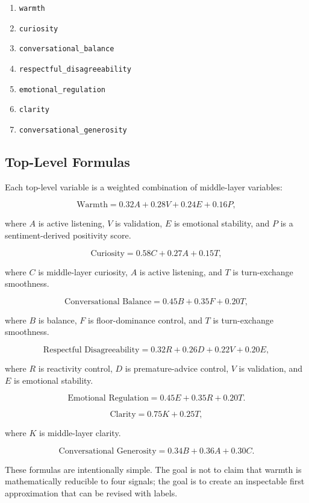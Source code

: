 \documentclass[11pt]{article}
\begin{document}
\begin{enumerate}[leftmargin=*]
  \item \texttt{warmth}
  \item \texttt{curiosity}
  \item \texttt{conversational\_balance}
  \item \texttt{respectful\_disagreeability}
  \item \texttt{emotional\_regulation}
  \item \texttt{clarity}
  \item \texttt{conversational\_generosity}
\end{enumerate}

\subsection{Top-Level Formulas}

Each top-level variable is a weighted combination of middle-layer variables:

\[
\text{Warmth} =
0.32A + 0.28V + 0.24E + 0.16P,
\]

where \(A\) is active listening, \(V\) is validation, \(E\) is emotional stability, and \(P\) is a sentiment-derived positivity score.

\[
\text{Curiosity} =
0.58C + 0.27A + 0.15T,
\]

where \(C\) is middle-layer curiosity, \(A\) is active listening, and \(T\) is turn-exchange smoothness.

\[
\text{Conversational Balance} =
0.45B + 0.35F + 0.20T,
\]

where \(B\) is balance, \(F\) is floor-dominance control, and \(T\) is turn-exchange smoothness.

\[
\text{Respectful Disagreeability} =
0.32R + 0.26D + 0.22V + 0.20E,
\]

where \(R\) is reactivity control, \(D\) is premature-advice control, \(V\) is validation, and \(E\) is emotional stability.

\[
\text{Emotional Regulation} =
0.45E + 0.35R + 0.20T.
\]

\[
\text{Clarity} =
0.75K + 0.25T,
\]

where \(K\) is middle-layer clarity.

\[
\text{Conversational Generosity} =
0.34B + 0.36A + 0.30C.
\]

These formulas are intentionally simple. The goal is not to claim that warmth is mathematically reducible to four signals; the goal is to create an inspectable first approximation that can be revised with labels.
\end{document}
